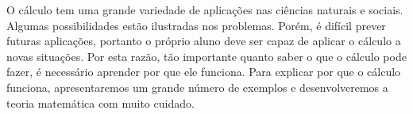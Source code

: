 O cálculo tem uma grande variedade de aplicações nas ciências naturais e
sociais. Algumas possibilidades estão ilustradas nos problemas.
Porém, é difícil prever futuras aplicações, portanto o próprio aluno
deve ser capaz de aplicar o cálculo a novas situações. Por esta razão, tão
importante quanto saber o que o cálculo pode fazer, é necessário aprender
por que ele funciona.
Para explicar por que o cálculo funciona, apresentaremos um grande número
de exemplos e desenvolveremos a teoria matemática com muito cuidado.

